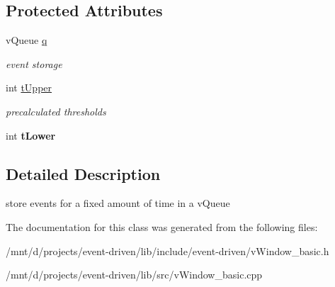 \subsection*{Protected Attributes}
\begin{DoxyCompactItemize}
\item 
\mbox{\label{classev_1_1vTempWindow_abed022ad51f68443a2350fbeabbb4233}} 
v\+Queue \hyperlink{classev_1_1vTempWindow_abed022ad51f68443a2350fbeabbb4233}{q}
\begin{DoxyCompactList}\small\item\em event storage \end{DoxyCompactList}\item 
\mbox{\label{classev_1_1vTempWindow_a909a8f6df0014d1f318c6209223f5fad}} 
int \hyperlink{classev_1_1vTempWindow_a909a8f6df0014d1f318c6209223f5fad}{t\+Upper}
\begin{DoxyCompactList}\small\item\em precalculated thresholds \end{DoxyCompactList}\item 
\mbox{\label{classev_1_1vTempWindow_a47845a9e47b73598e2a325c06e994bed}} 
int {\bfseries t\+Lower}
\end{DoxyCompactItemize}


\subsection{Detailed Description}
store events for a fixed amount of time in a v\+Queue 

The documentation for this class was generated from the following files\+:\begin{DoxyCompactItemize}
\item 
/mnt/d/projects/event-\/driven/lib/include/event-\/driven/v\+Window\+\_\+basic.\+h\item 
/mnt/d/projects/event-\/driven/lib/src/v\+Window\+\_\+basic.\+cpp\end{DoxyCompactItemize}
